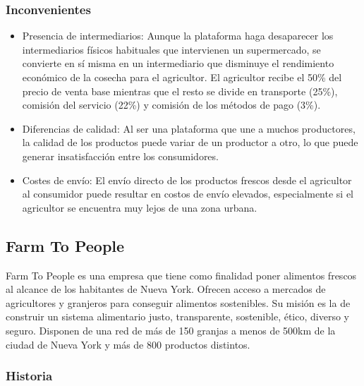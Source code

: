 \subsubsection{Inconvenientes}

\begin{itemize}

	\item Presencia de intermediarios: Aunque la plataforma haga desaparecer los intermediarios físicos habituales que intervienen un supermercado, se convierte en sí misma en un intermediario que disminuye el rendimiento económico de la cosecha para el agricultor. El agricultor recibe el 50\% del precio de venta base mientras que el resto se divide en transporte (25\%), comisión del servicio (22\%) y comisión de los métodos de pago (3\%).

	\item Diferencias de calidad: Al ser una plataforma que une a muchos productores, la calidad de los productos puede variar de un productor a otro, lo que puede generar insatisfacción entre los consumidores.

	\item Costes de envío: El envío directo de los productos frescos desde el agricultor al consumidor puede resultar en costos de envío elevados, especialmente si el agricultor se encuentra muy lejos de una zona urbana.

\end{itemize}


\subsection{Farm To People}
Farm To People es una empresa que tiene como finalidad poner alimentos frescos al alcance de los habitantes de Nueva York. Ofrecen acceso a mercados de agricultores y granjeros para conseguir alimentos sostenibles. Su misión es la de construir un sistema alimentario justo, transparente, sostenible, ético, diverso y seguro. Disponen de una red de más de 150 granjas a menos de 500km de la ciudad de Nueva York y más de 800 productos distintos.

\subsubsection{Historia}

